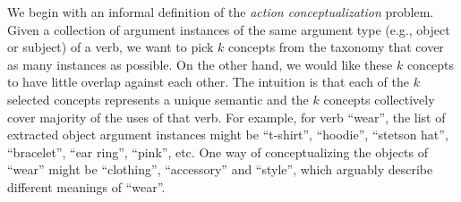 We begin with an informal definition of the
{\em action conceptualization} problem.
Given a collection of argument instances of the same argument
type (e.g., object or subject) of a
verb, %
we want to pick $k$ concepts from the taxonomy
that cover as many instances as possible.
On the other hand, we would like these $k$ concepts to
have little overlap against each other.
The intuition is that each of the $k$ selected concepts represents a unique
semantic and the $k$ concepts collectively cover majority of the uses of that verb.
For example, for verb ``wear'', the list of extracted
object argument instances might be ``t-shirt'', ``hoodie'', ``stetson hat'', ``bracelet'',
``ear ring'', ``pink'', etc. One way of conceptualizing the objects of
``wear'' might be ``clothing'', ``accessory'' and ``style'', which arguably
describe different meanings of ``wear''.

